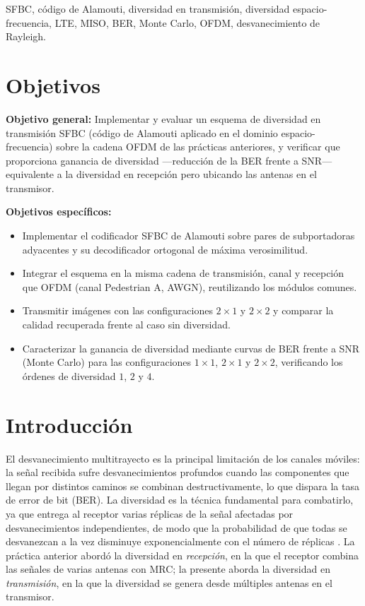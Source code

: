\documentclass[conference,onecolumn]{IEEEtran}
\begin{document}
\begin{IEEEkeywords}
SFBC, c\'odigo de Alamouti, diversidad en transmisi\'on, diversidad espacio-frecuencia, LTE, MISO, BER, Monte Carlo, OFDM, desvanecimiento de Rayleigh.
\end{IEEEkeywords}

\section*{Objetivos}

\textbf{Objetivo general:} Implementar y evaluar un esquema de diversidad en transmisi\'on SFBC (c\'odigo de Alamouti aplicado en el dominio espacio-frecuencia) sobre la cadena OFDM de las pr\'acticas anteriores, y verificar que proporciona ganancia de diversidad ---reducci\'on de la BER frente a SNR--- equivalente a la diversidad en recepci\'on pero ubicando las antenas en el transmisor.

\textbf{Objetivos espec\'ificos:}
\begin{itemize}
    \item Implementar el codificador SFBC de Alamouti sobre pares de subportadoras adyacentes y su decodificador ortogonal de m\'axima verosimilitud.
    \item Integrar el esquema en la misma cadena de transmisi\'on, canal y recepci\'on que OFDM (canal Pedestrian A, AWGN), reutilizando los m\'odulos comunes.
    \item Transmitir im\'agenes con las configuraciones $2\times1$ y $2\times2$ y comparar la calidad recuperada frente al caso sin diversidad.
    \item Caracterizar la ganancia de diversidad mediante curvas de BER frente a SNR (Monte Carlo) para las configuraciones $1\times1$, $2\times1$ y $2\times2$, verificando los \'ordenes de diversidad $1$, $2$ y $4$.
\end{itemize}

\section{Introducci\'on}

El desvanecimiento multitrayecto es la principal limitaci\'on de los canales m\'oviles: la se\~nal recibida sufre desvanecimientos profundos cuando las componentes que llegan por distintos caminos se combinan destructivamente, lo que dispara la tasa de error de bit (BER). La diversidad es la t\'ecnica fundamental para combatirlo, ya que entrega al receptor varias r\'eplicas de la se\~nal afectadas por desvanecimientos independientes, de modo que la probabilidad de que todas se desvanezcan a la vez disminuye exponencialmente con el n\'umero de r\'eplicas \cite{goldsmith2005wireless,rappaport2002}. La pr\'actica anterior abord\'o la diversidad en \emph{recepci\'on}, en la que el receptor combina las se\~nales de varias antenas con MRC; la presente aborda la diversidad en \emph{transmisi\'on}, en la que la diversidad se genera desde m\'ultiples antenas en el transmisor.
\end{document}
